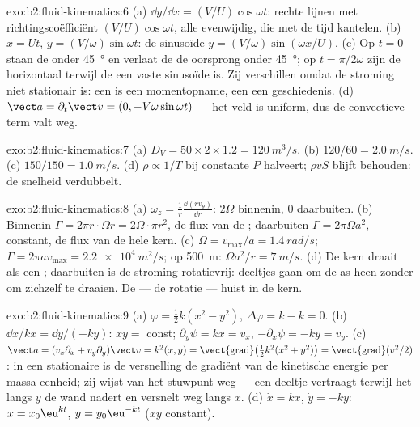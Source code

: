 \begin{solution}{exo:b2:fluid-kinematics:6}
(a) $\dd y/\dd x = (V/U)\cos\omega t$: rechte lijnen met
richtingscoëfficiënt $(V/U)\cos\omega t$, alle evenwijdig, die met de tijd
kantelen. (b) $x = Ut$, $y =
(V/\omega)\sin\omega t$: de sinusoïde
$y = (V/\omega)\sin(\omega x/U)$. (c) Op $t = 0$ staan de  onder
\qty{45}{\degree} en verlaat de  de oorsprong onder
\qty{45}{\degree}; op $t = \pi/2\omega$ zijn de  horizontaal
terwijl de  een vaste sinusoïde is. Zij verschillen omdat de
stroming niet stationair is: een  is een momentopname, een
 een geschiedenis. (d)
$\vect a = \partial_t\vect v = (0, -V\omega\sin\omega t)$ --- het veld is
uniform, dus de convectieve term valt weg.
\end{solution}

\begin{solution}{exo:b2:fluid-kinematics:7}
(a) $D_V = 50 \times 2 \times 1.2 = \qty{120}{m^3/s}$. (b)
$120/60 = \qty{2.0}{m/s}$. (c) $150/150 = \qty{1.0}{m/s}$. (d)
$\rho \propto 1/T$ bij constante $P$ halveert; $\rho vS$ blijft behouden: de
snelheid verdubbelt.
\end{solution}

\begin{solution}{exo:b2:fluid-kinematics:8}
(a) $\omega_z = \frac1r\frac{\dd(rv_\theta)}{\dd r}$: $2\Omega$ binnenin,
$0$ daarbuiten. (b) Binnenin
$\Gamma = 2\pi r\cdot\Omega r = 2\Omega\cdot\pi r^2$, de flux van de
; daarbuiten $\Gamma = 2\pi\Omega a^2$, constant, de flux van de
hele kern. (c) $\Omega = v_{\max}/a = \qty{1.4}{rad/s}$;
$\Gamma = 2\pi av_{\max}
= \qty{2.2e4}{m^2/s}$; op \qty{500}{m}:
$\Omega a^2/r = \qty{7}{m/s}$. (d) De kern draait als een ;
daarbuiten is de stroming rotatievrij: deeltjes gaan om de as heen zonder om
zichzelf te draaien. De  --- de rotatie --- huist in de kern.
\end{solution}

\begin{solution}{exo:b2:fluid-kinematics:9}
(a) $\varphi = \tfrac12k(x^2 - y^2)$, $\Delta\varphi = k - k = 0$. (b)
$\dd x/
kx = \dd y/(-ky)$: $xy = $ const; $\partial_y\psi = kx = v_x$,
$-\partial_x\psi =
-ky = v_y$. (c)
$\vect a = (v_x\partial_x + v_y\partial_y)\vect v = k^2(x, y) =
\operatorname{\vect{grad}}\bigl(\tfrac12k^2(x^2 + y^2)\bigr) = \operatorname{\vect{grad}}
(v^2/2)$:
in een stationaire  is de versnelling de gradiënt van
de kinetische energie per massa-eenheid; zij wijst van het stuwpunt weg ---
een deeltje vertraagt terwijl het langs $y$ de wand nadert en versnelt weg
langs $x$. (d) $\dot x = kx$, $\dot y = -ky$: $x = x_0\eu^{kt}$,
$y = y_0\eu^{-kt}$ ($xy$ constant).
\end{solution}

